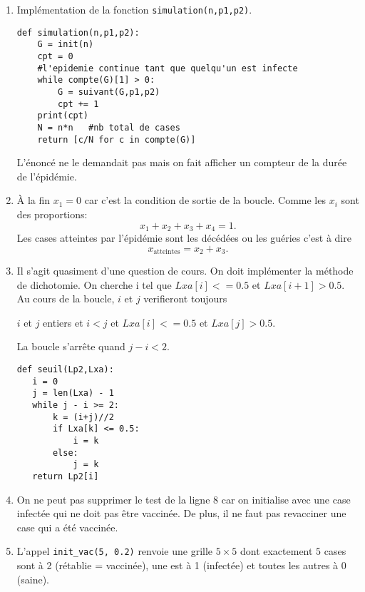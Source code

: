 \begin{enumerate}
 \item Implémentation de la fonction \texttt{simulation(n,p1,p2)}.
\begin{lstlisting}
def simulation(n,p1,p2):
    G = init(n)
    cpt = 0
    #l'epidemie continue tant que quelqu'un est infecte
    while compte(G)[1] > 0:
        G = suivant(G,p1,p2)
        cpt += 1
    print(cpt)
    N = n*n   #nb total de cases
    return [c/N for c in compte(G)]
\end{lstlisting}
L'énoncé ne le demandait pas mais on fait afficher un compteur de la durée de l'épidémie.

 \item \`A la fin $x_1=0$ car c'est la condition de sortie de la boucle. Comme les $x_i$ sont des proportions:
\[
 x_1 + x_2 + x_3 + x_4 = 1.
\]
Les cases atteintes par l'épidémie sont les décédées ou les guéries c'est à dire
\[
x_{\text{atteintes}} = x_2 + x_3.
\]

 \item Il s'agit quasiment d'une question de cours. On doit implémenter la méthode de dichotomie. On cherche i tel que $Lxa[i]<= 0.5$ et $Lxa[i+1] > 0.5$. Au cours de la boucle, $i$ et $j$ verifieront toujours
\begin{center}
 $i$ et $j$ entiers et $i < j$ et $Lxa[i] <= 0.5$ et $Lxa[j] > 0.5$.
\end{center}
La boucle s'arrête quand $j-i < 2$.
\begin{lstlisting}
def seuil(Lp2,Lxa):
   i = 0
   j = len(Lxa) - 1
   while j - i >= 2:
       k = (i+j)//2
       if Lxa[k] <= 0.5:
           i = k
       else:
           j = k
   return Lp2[i]
 \end{lstlisting}
 
 \item On ne peut pas supprimer le test de la ligne 8 car on initialise avec une case infectée qui ne doit pas être vaccinée. De plus, il ne faut pas revacciner une case qui a été vaccinée.
 
 \item L'appel \texttt{init\_vac(5, 0.2)} renvoie une grille $5 \times 5$ dont exactement $5$ cases sont à 2 (rétablie = vaccinée), une est à 1 (infectée) et toutes les autres à 0 (saine).

\end{enumerate}